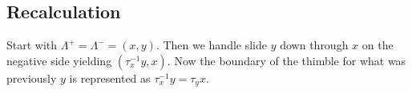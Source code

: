 \documentclass[11pt]{amsart}
\newcommand{\Leg}{\Lambda}
\begin{document}
\subsection{Recalculation}

Start with $\Leg^{+} = \Leg^{-} = (x, y)$. Then we handle slide $y$ down through $x$ on the negative side yielding $(\tau_{x}^{-1}y, x)$. Now the boundary of the thimble for what was previously $y$ is represented as $\tau_{x}^{-1}y = \tau_{y}x$.

\begin{comment}
\section{Some speculation}\label{Sec:Speculation}

We'll sketch a strategy for proving that the answer to Question \ref{Q:OTCriterion} is yes. Experts might recognize that this is nonsense or that there is a more elegant strategy for addressing Question \ref{Q:OTCriterion}.

Let's take a fixed $\Sigma$ which has an overtwisted $t$-invariant neighborhood $[0, 1] \times \Sigma$. We'll attempt to prove that $\Sigma$ is the result of an OOB attachment.

The $h$-principle should allow us to find OODs in a $t$-invariant $(0, 1)_{t} \times \Sigma$ since this neighborhood is overtwisted. I don't know how to formalize this. Assuming this is true, there will be OOBs inside $[0 ,1)_{t} \times \Sigma$ which can be attached to $\{ 0 \} \times \Sigma$: Attach one end of a contact $1$-handle to the dividing set of $\{ 0 \} \times \Sigma$ and the other end to the dividing set of the OOD. This is the same as first connecting $\{0\} \times \Sigma$ to the boundary of a Darboux ball -- which gives us back $\Sigma$, unmodified -- and then applying an OOB attachment.

Say we attach such an OOB, $B_{1}$, to $\{ 0 \} \times \Sigma$. Then by \cite[Theorem 1.2.5]{HH:Convex} we can get from $\{ 0 \} \times \Sigma$ to $\{ 1 \} \times \Sigma$ by a sequence of bypass attachments $B_{1}, \cdots, B_{k}$ so that the union of all of the bypass attachment slices will be isotopic to the $t$-invariant $[0, 1]\times \Sigma$.

If we can perform handle-slides and rearrange the orders of attachment so that there are bypasses $B'_{1}, \dots, B'_{k'}$ getting us from $\{ 0 \} \times \Sigma$ back to itself and with $B'_{k'}$ obviously overtwisted, then $\Sigma = \{ 1 \} \times \Sigma$ will be the result of an OOB attachment to $\Sigma'$, which is given by attaching the bypasses $B_{1}', \dots, B_{k'-1}'$, answering Question \ref{Q:OTCriterion} in the affirmative.


\end{comment}
\end{document}

